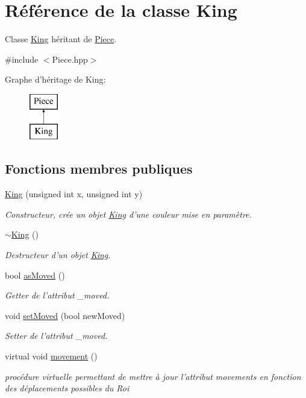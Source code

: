 \hypertarget{class_king}{\section{Référence de la classe King}
\label{class_king}
}


Classe \hyperlink{class_king}{King} héritant de \hyperlink{class_piece}{Piece}.  




{\ttfamily \#include $<$Piece.\-hpp$>$}

Graphe d'héritage de King\-:\begin{figure}[H]
\begin{center}
\leavevmode
\includegraphics[height=2.000000cm]{class_king}
\end{center}
\end{figure}
\subsection*{Fonctions membres publiques}
\begin{DoxyCompactItemize}
\item 
\hyperlink{class_king_af934f2cda4bb5baca66c2ae114997b6e}{King} (unsigned int x, unsigned int y)
\begin{DoxyCompactList}\small\item\em Constructeur, crée un objet \hyperlink{class_king}{King} d'une couleur mise en paramètre. \end{DoxyCompactList}\item 
\hyperlink{class_king_aac368ce96e2b12f62e3608d27262e941}{$\sim$\-King} ()
\begin{DoxyCompactList}\small\item\em Destructeur d'un objet \hyperlink{class_king}{King}. \end{DoxyCompactList}\item 
bool \hyperlink{class_king_a1e7d9da6599c3e3ab9cbc4d5026f0dcf}{as\-Moved} ()
\begin{DoxyCompactList}\small\item\em Getter de l'attribut \-\_\-moved. \end{DoxyCompactList}\item 
void \hyperlink{class_king_a29a4ff10443abb0b0ecd088c88861d18}{set\-Moved} (bool new\-Moved)
\begin{DoxyCompactList}\small\item\em Setter de l'attribut \-\_\-moved. \end{DoxyCompactList}\item 
virtual void \hyperlink{class_king_aabc0b7a9a553383e7aba11daecbbc61c}{movement} ()
\begin{DoxyCompactList}\small\item\em procédure virtuelle permettant de mettre à jour l'attribut movements en fonction des déplacements possibles du Roi \end{DoxyCompactList}\end{DoxyCompactItemize}
